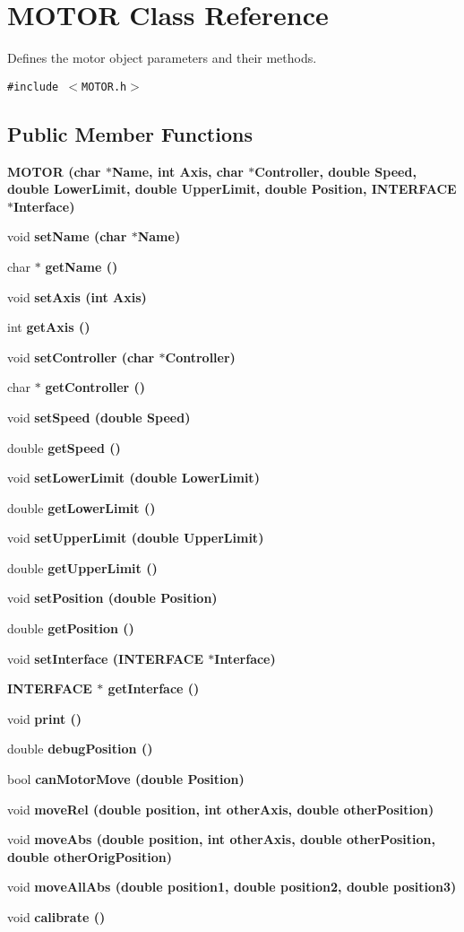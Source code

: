 \section{MOTOR Class Reference}
\label{classMOTOR}
Defines the motor object parameters and their methods.  


{\tt \#include $<$MOTOR.h$>$}

\subsection*{Public Member Functions}
\begin{CompactItemize}
\item 
\bf{MOTOR} (char $\ast$\bf{Name}, int \bf{Axis}, char $\ast$\bf{Controller}, double \bf{Speed}, double \bf{Lower\-Limit}, double \bf{Upper\-Limit}, double \bf{Position}, \bf{INTERFACE} $\ast$\bf{Interface})
\item 
void \bf{set\-Name} (char $\ast$\bf{Name})
\item 
char $\ast$ \bf{get\-Name} ()
\item 
void \bf{set\-Axis} (int \bf{Axis})
\item 
int \bf{get\-Axis} ()
\item 
void \bf{set\-Controller} (char $\ast$\bf{Controller})
\item 
char $\ast$ \bf{get\-Controller} ()
\item 
void \bf{set\-Speed} (double \bf{Speed})
\item 
double \bf{get\-Speed} ()
\item 
void \bf{set\-Lower\-Limit} (double \bf{Lower\-Limit})
\item 
double \bf{get\-Lower\-Limit} ()
\item 
void \bf{set\-Upper\-Limit} (double \bf{Upper\-Limit})
\item 
double \bf{get\-Upper\-Limit} ()
\item 
void \bf{set\-Position} (double \bf{Position})
\item 
double \bf{get\-Position} ()
\item 
void \bf{set\-Interface} (\bf{INTERFACE} $\ast$\bf{Interface})
\item 
\bf{INTERFACE} $\ast$ \bf{get\-Interface} ()
\item 
void \bf{print} ()
\item 
double \bf{debug\-Position} ()
\item 
bool \bf{can\-Motor\-Move} (double \bf{Position})
\item 
void \bf{move\-Rel} (double position, int other\-Axis, double other\-Position)
\item 
void \bf{move\-Abs} (double position, int other\-Axis, double other\-Position, double other\-Orig\-Position)
\item 
void \bf{move\-All\-Abs} (double position1, double position2, double position3)
\item 
void \bf{calibrate} ()
\end{CompactItemize}
